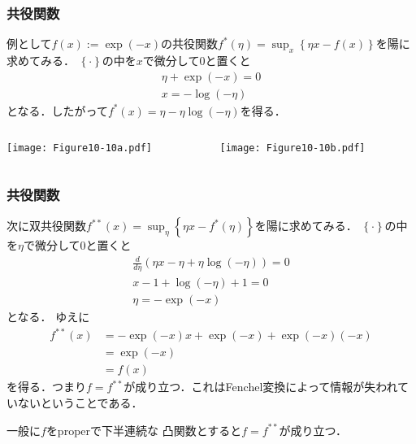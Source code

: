 \documentclass[10pt,hyperref={unicode}]{beamer}
\newcommand{\parentheses}[1]{\left(#1\right)}
\newcommand{\braces}[1]{\left\{#1\right\}}
\begin{document}
\begin{frame}
\frametitle{共役関数}
例として$f\parentheses{x} := \exp \parentheses{-x}$の共役関数$f^*\parentheses{\eta} = \sup_{x}\braces{\eta x - f\parentheses{x}}$を陽に求めてみる．
$\braces{\cdot}$の中を$x$で微分して$0$と置くと
\begin{gather*}
    \eta + \exp \parentheses{-x} = 0 \\
    x = - \log \parentheses{-\eta}
\end{gather*}
となる．したがって$f^*\parentheses{x} = \eta - \eta \log \parentheses{-\eta}$を得る．

    \begin{columns}
        \begin{column}{0.5\textwidth}
            \begin{center}
                \texttt{[image: Figure10-10a.pdf]}
            \end{center}
        \end{column}
        \begin{column}{0.5\textwidth}
            \begin{center}
                \texttt{[image: Figure10-10b.pdf]}
            \end{center}
        \end{column}
    \end{columns}


\end{frame}

\begin{frame}
\frametitle{共役関数}

次に双共役関数$f^{**}\parentheses{x} = \sup_\eta \braces{\eta x - f^*\parentheses{\eta}}$を陽に求めてみる．
$\braces{\cdot}$の中を$\eta$で微分して$0$と置くと
\begin{gather*}
    \frac{d}{d\eta} \parentheses{\eta x - \eta + \eta \log \parentheses{-\eta}} = 0 \\
    x - 1 + \log \parentheses{-\eta} + 1 = 0 \\
    \eta = - \exp \parentheses{-x}
\end{gather*}
となる．
ゆえに
\begin{align*}
    f^{**}\parentheses{x}
    &= - \exp \parentheses{-x}x + \exp \parentheses{-x} + \exp \parentheses{-x} \parentheses{-x} \\
    &= \exp \parentheses{-x} \\
    &= f\parentheses{x}
\end{align*}
を得る．つまり$f = f^{**}$が成り立つ．これはFenchel変換によって情報が失われていないということである．

\bigskip

一般に$f$をproperで下半連続な
凸関数とすると$f = f^{**}$が成り立つ．
\end{frame}
\end{document}

